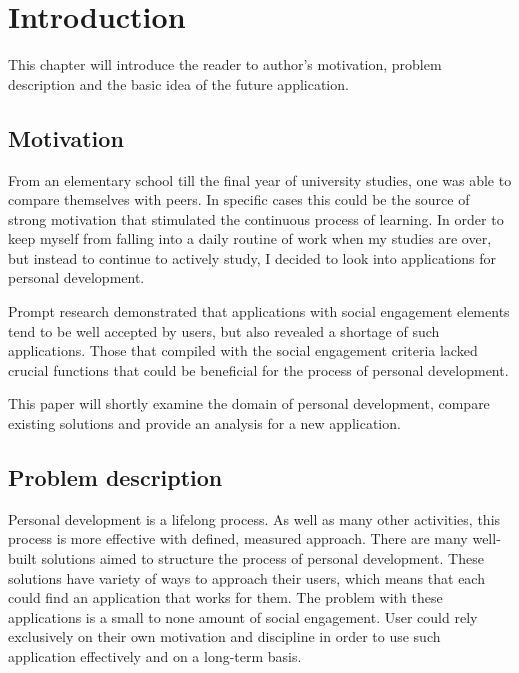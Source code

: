 

\chapter{Introduction}\label{ch:introduction}

This chapter will introduce the reader to author's motivation, problem description and the basic idea of the future application.


\section{Motivation}\label{sec:introduction-motivation}

From an elementary school till the final year of university studies, one was able to compare themselves with peers.
In specific cases this could be the source of strong motivation that stimulated the continuous process of learning.
In order to keep myself from falling into a daily routine of work when my studies are over,
but instead to continue to actively study, I decided to look into applications for personal development.

Prompt research demonstrated that applications with social engagement elements tend to be well accepted by users,
but also revealed a shortage of such applications.
Those that compiled with the social engagement criteria lacked crucial functions that could be beneficial for the process of personal development.

This paper will shortly examine the domain of personal development, compare existing solutions and provide an analysis for a
new application.


\section{Problem description}\label{sec:problem-description}

Personal development is a lifelong process.
As well as many other activities, this process is more effective with defined, measured approach.
There are many well-built solutions aimed to structure the process of personal development.
These solutions have variety of ways to approach their users, which means that each could find an application that works for them.
The problem with these applications is a small to none amount of social engagement.
User could rely exclusively on their own motivation and discipline in order to use such application effectively and on a long-term basis.

